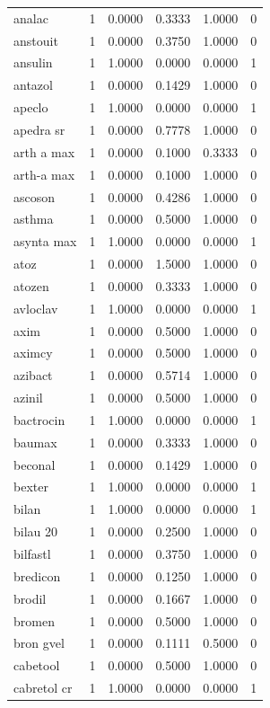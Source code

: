 \begin{longtable}{p{3.0cm}rrrrr}
analac & 1 & 0.0000 & 0.3333 & 1.0000 & 0 \\
anstouit & 1 & 0.0000 & 0.3750 & 1.0000 & 0 \\
ansulin & 1 & 1.0000 & 0.0000 & 0.0000 & 1 \\
antazol & 1 & 0.0000 & 0.1429 & 1.0000 & 0 \\
apeclo & 1 & 1.0000 & 0.0000 & 0.0000 & 1 \\
apedra sr & 1 & 0.0000 & 0.7778 & 1.0000 & 0 \\
arth a max & 1 & 0.0000 & 0.1000 & 0.3333 & 0 \\
arth-a max & 1 & 0.0000 & 0.1000 & 1.0000 & 0 \\
ascoson & 1 & 0.0000 & 0.4286 & 1.0000 & 0 \\
asthma & 1 & 0.0000 & 0.5000 & 1.0000 & 0 \\
asynta max & 1 & 1.0000 & 0.0000 & 0.0000 & 1 \\
atoz & 1 & 0.0000 & 1.5000 & 1.0000 & 0 \\
atozen & 1 & 0.0000 & 0.3333 & 1.0000 & 0 \\
avloclav & 1 & 1.0000 & 0.0000 & 0.0000 & 1 \\
axim & 1 & 0.0000 & 0.5000 & 1.0000 & 0 \\
aximcy & 1 & 0.0000 & 0.5000 & 1.0000 & 0 \\
azibact & 1 & 0.0000 & 0.5714 & 1.0000 & 0 \\
azinil & 1 & 0.0000 & 0.5000 & 1.0000 & 0 \\
bactrocin & 1 & 1.0000 & 0.0000 & 0.0000 & 1 \\
baumax & 1 & 0.0000 & 0.3333 & 1.0000 & 0 \\
beconal & 1 & 0.0000 & 0.1429 & 1.0000 & 0 \\
bexter & 1 & 1.0000 & 0.0000 & 0.0000 & 1 \\
bilan & 1 & 1.0000 & 0.0000 & 0.0000 & 1 \\
bilau 20 & 1 & 0.0000 & 0.2500 & 1.0000 & 0 \\
bilfastl & 1 & 0.0000 & 0.3750 & 1.0000 & 0 \\
bredicon & 1 & 0.0000 & 0.1250 & 1.0000 & 0 \\
brodil & 1 & 0.0000 & 0.1667 & 1.0000 & 0 \\
bromen & 1 & 0.0000 & 0.5000 & 1.0000 & 0 \\
bron gvel & 1 & 0.0000 & 0.1111 & 0.5000 & 0 \\
cabetool & 1 & 0.0000 & 0.5000 & 1.0000 & 0 \\
cabretol cr & 1 & 1.0000 & 0.0000 & 0.0000 & 1 \\

\end{longtable}
